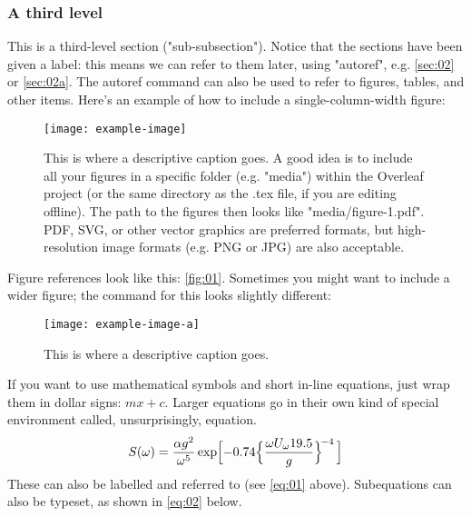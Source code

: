 \documentclass[draft, english]{volcanica-template}
\begin{document}
\subsubsection{A third level}\label{sec:02aa}
This is a third-level section ("sub-subsection"). Notice that the sections have been given a label: this means we can refer to them later, using "autoref", e.g. \autoref{sec:02} or \autoref{sec:02a}. The autoref command can also be used to refer to figures, tables, and other items. Here's an example of how to include a single-column-width figure:

\begin{figure}[!b]								%
\centering
\texttt{[image: example-image]} %
\caption{This is where a descriptive caption goes. A good idea is to include all your figures in a specific folder (e.g. "media") within the Overleaf project (or the same directory as the .tex file, if you are editing offline). The path to the figures then looks like "media/figure-1.pdf". PDF, SVG, or other vector graphics are preferred formats, but high-resolution image formats (e.g. PNG or JPG) are also acceptable.}		%
\label{fig:01}			%
\end{figure}

Figure references look like this: \autoref{fig:01}. Sometimes you might want to include a wider figure; the command for this looks slightly different:
\begin{figure*}[!t]								%
\centering
\texttt{[image: example-image-a]} %
\caption{This is where a descriptive caption goes.}	%
\label{fig:02}									%
\end{figure*}

If you want to use mathematical symbols and short in-line equations, just wrap them in dollar signs: $mx +c$. Larger equations go in their own kind of special environment called, unsurprisingly, equation.
\begin{equation}
S(\omega) = \frac{\alpha g^2}{\omega^5} \exp\Bigl[ -0.74\Bigl\{\frac{\omega U_\omega 19.5}{g}\Bigr\}^{\!-4}\,\Bigr] 
\label{eq:01}\end{equation}
These can also be labelled and referred to (see \autoref{eq:01} above). Subequations can also be typeset, as shown in \autoref{eq:02} below.
\end{document}
